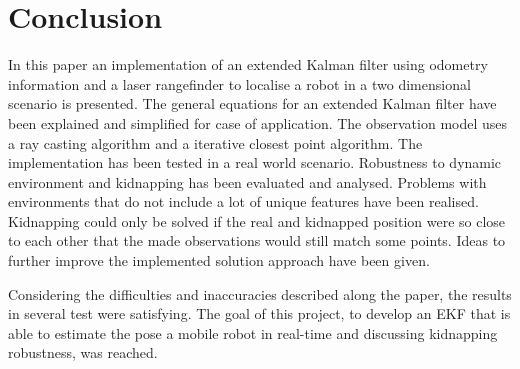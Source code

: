 \section{Conclusion}
\label{sec:Conclusion}


In this paper an implementation of an extended Kalman filter using odometry information and a laser rangefinder to localise a robot in a two dimensional scenario is presented. The general equations for an extended Kalman filter have been explained and simplified for case of application. The observation model uses a ray casting algorithm and a iterative closest point algorithm. The implementation has been tested in a real world scenario. Robustness to dynamic environment and kidnapping has been evaluated and analysed. Problems with environments that do not include a lot of unique features have been realised. Kidnapping could only be solved if the real and kidnapped position were so close to each other that the made observations would still match some points. Ideas to further improve the implemented solution approach have been given.

Considering the difficulties and inaccuracies described along the paper, the results in several test were satisfying. The goal of this project, to develop an EKF that is able to estimate the pose a mobile robot in real-time and discussing kidnapping robustness, was reached. 




